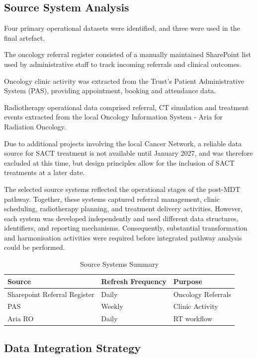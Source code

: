 \subsection{Source System Analysis}

Four primary operational datasets were identified, and three were used in the final artefact.

The oncology referral register consisted of a manually maintained SharePoint list used by administrative staff to track incoming referrals and clinical outcomes. 

Oncology clinic activity was extracted from the Trust's Patient Administrative System (PAS), providing appointment, booking and attendance data.

Radiotherapy operational data comprised referral, CT simulation and treatment events extracted from the local Oncology Information System - Aria for Radiation Oncology. 

Due to additional projects involving the local Cancer Network, a reliable data source for SACT treatment is not available until January 2027, and was therefore excluded at this time, but design principles allow for the inclusion of SACT treatments at a later date. 

The selected source systems reflected the operational stages of the post-MDT pathway. Together, these systems captured referral management, clinic scheduling, radiotherapy planning, and treatment delivery activities. However, each system was developed independently and used different data structures, identifiers, and reporting mechanisms. Consequently, substantial transformation and harmonisation activities were required before integrated pathway analysis could be performed. 

\begin{table}[h]
    \centering
    \begin{tabular}{|p{7cm}|p{4cm}|p{4cm}|}
        \hline
        \textbf{Source} & \textbf{Refresh Frequency} & \textbf{Purpose} \\
        \hline\hline
        Sharepoint Referral Register & Daily & Oncology Referrals \\
        PAS & Weekly & Clinic Activity \\
        Aria RO & Daily & RT workflow \\
        \hline
    \end{tabular}
    \caption{Source Systems Summary}
\end{table}

\subsection{Data Integration Strategy}

